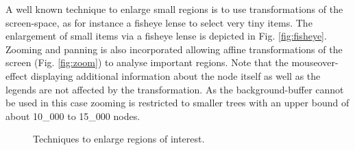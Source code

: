 \begin{itemize}
A well known technique to enlarge small regions is to use transformations of the screen-space, as for instance a fisheye lense to select very tiny items. The enlargement of small items via a fisheye lense is depicted in Fig. \ref{fig:fisheye}. Zooming and panning is also incorporated allowing affine transformations of the screen (Fig. \ref{fig:zoom}) to analyse important regions. Note that the mouseover-effect displaying additional information about the node itself as well as the legends are not affected by the transformation. As the background-buffer cannot be used in this case zooming is restricted to smaller trees with an upper bound of about 10\_000 to 15\_000 nodes.

\begin{figure}
\centering
{}
\caption{Techniques to enlarge regions of interest.}
\end{figure}


\end{itemize}
